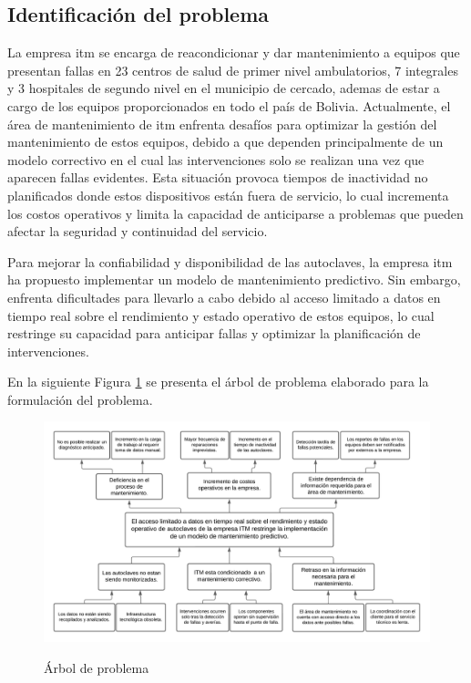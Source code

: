\subsection*{Identificación del problema}
La empresa \acrshort{itm} se encarga de reacondicionar y dar mantenimiento a equipos que presentan fallas en 23 centros de salud de primer nivel ambulatorios, 7 integrales y 3 hospitales de segundo nivel en el municipio de cercado, ademas de estar a cargo de los equipos proporcionados en todo el país de Bolivia. Actualmente, el área de mantenimiento de \acrshort{itm} enfrenta desafíos para optimizar la gestión del mantenimiento de estos equipos, debido a que dependen principalmente de un modelo correctivo en el cual las intervenciones solo se realizan una vez que aparecen fallas evidentes. Esta situación provoca tiempos de inactividad no planificados donde estos dispositivos están fuera de servicio, lo cual incrementa los costos operativos y limita la capacidad de anticiparse a problemas que pueden afectar la seguridad y continuidad del servicio.

Para mejorar la confiabilidad y disponibilidad de las autoclaves, la empresa \acrshort{itm} ha propuesto implementar un modelo de mantenimiento predictivo. Sin embargo, enfrenta dificultades para llevarlo a cabo debido al acceso limitado a datos en tiempo real sobre el rendimiento y estado operativo de estos equipos, lo cual restringe su capacidad para anticipar fallas y optimizar la planificación de intervenciones.


En la siguiente Figura \ref{fig:arbol} se presenta el árbol de problema elaborado para la formulación del problema.

        \begin{figure}[!htb]
            \centering
            \caption{Árbol de problema} %
            {\includegraphics[width=1\columnwidth]{Figuras/arbol.png}}
            \label{fig:arbol}
        \end{figure}
 
